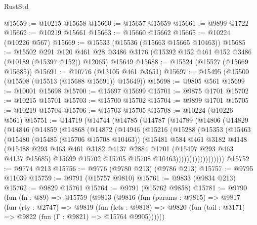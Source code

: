 \begin{lexlean}{RustStd}
\begin{coremodule}
@15659 := @10215 @15658
@15660 := @15657 @15659
@15661 := @9899 @1722
@15662 := @10219 @15661
@15663 := @15660 @15662
@15665 := @10224 (@10226 @567)
@15669 := @15533 (@15536 (@15663 @15665 @10463))
@15685 := @15502
    @291
    @120
    @461
    @28
    @3486
    @3176
    (@15392 @152 @461 @152 @3486 (@10189 (@15397 @152)) @12065)
    @15649
@15688 := @15524 (@15527 (@15669 @15685))
@15691 := @10776 (@13105 @461 @3651)
@15697 := @15495 (@15500 (@15508 (@15513 (@15688 @15691)) @15649))
@15698 := @9805 @561
@15699 := @10001 @15698
@15700 := @15697 @15699
@15701 := @9875 @1701
@15702 := @10215 @15701
@15703 := @15700 @15702
@15704 := @9899 @1701
@15705 := @10219 @15704
@15706 := @15703 @15705
@15708 := @10224 (@10226 @561)
@15751 := @14719
    (@14744
      (@14785
        (@14787
          (@14789
            (@14806
              (@14829
                (@14846
                  (@14859
                    (@14868
                      (@14872
                        (@14946
                          (@15216
                            (@15288
                              (@15353
                                (@15463
                                  (@15480
                                    (@15485 (@15706 @15708 @10463))
                                    (@15481
                                      @584
                                      @461
                                      @3182
                                      @4148
                                      (@15488
                                        @293
                                        @463
                                        @461
                                        @3182
                                        @4137
                                        @2884
                                        @1701
                                        (@15497 @293 @463 @4137 @15685)
                                        @15699
                                        @15702
                                        @15705
                                        @15708
                                        @10463))))))))))))))))))
@15752 := @9774 @213
@15756 := @9776 (@9780 @213) (@9786 @213)
@15757 := @9795 @11039
@15759 := @9791 (@15757 @9810)
@15761 := @9833 (@9834 @213)
@15762 := @9829 @15761
@15764 := @9791 (@15762 @9858)
@15781 := @9790
    (fun (fn : @89) =>
    @15759
      (@9813
        (@9816
          (fun (params : @9815) =>
          @9817
            (fun (rty : @2747) =>
            @9819
              (fun (lets : @9818) =>
              @9820 (fun (tail : @3171) => @9822 (fun (Γ : @9821) => @15764 @9905))))))

\end{coremodule}
\end{lexlean}
